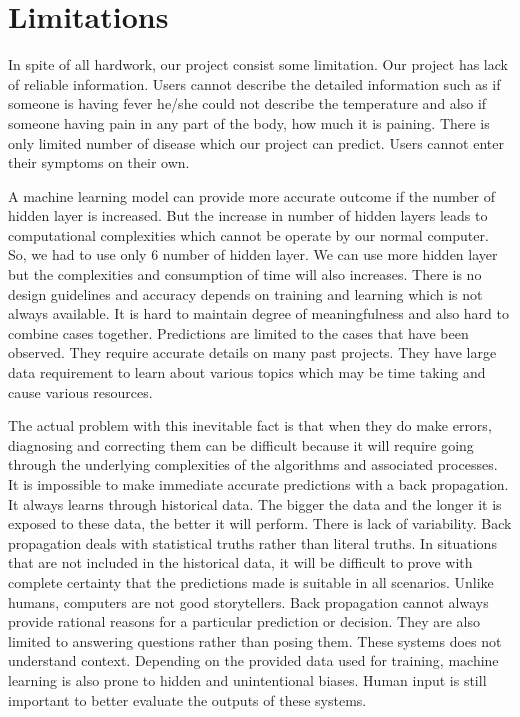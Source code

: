 {\section{Limitations}
In spite of all hardwork, our project consist some limitation. Our project has lack of reliable information. Users cannot describe the detailed information such as if someone is having fever he/she could not describe the temperature and also if someone having pain in any part of the body, how much it is paining. There is only limited number of disease which our project can predict. Users cannot enter their symptoms on their own.\par 
A machine learning model can provide more accurate outcome if the number of hidden layer is increased. But the increase in number of hidden layers leads to computational complexities which cannot be operate by our normal computer. So, we had to use only 6 number of hidden layer. We can use more hidden layer but the complexities and consumption of time will also increases. There is no design guidelines and accuracy depends on training and learning which is not always available. It is hard to maintain degree of meaningfulness and also hard to combine cases together. Predictions are limited to the cases that have been observed. They require accurate details on many past projects. They have large data requirement to learn about various topics which may be time taking and cause various resources.\par 
The actual problem with this inevitable fact is that when they do make errors, diagnosing and correcting them can be difficult because it will require going through the underlying complexities of the algorithms and associated processes. It is impossible to make immediate accurate predictions with a back propagation. It always learns through historical data. The bigger the data and the longer it is exposed to these data, the better it will perform. There is lack of variability. Back propagation deals with statistical truths rather than literal truths. In situations that are not included in the historical data, it will be difficult to prove with complete certainty that the predictions made is suitable in all scenarios. Unlike humans, computers are not good storytellers. Back propagation cannot always provide rational reasons for a particular prediction or decision. They are also limited to answering questions rather than posing them. These systems does not understand context. Depending on the provided data used for training, machine learning is also prone to hidden and unintentional biases. Human input is still important to better evaluate the outputs of these systems.

}
